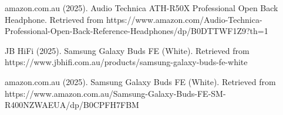 \documentclass[a4paper,12pt]{article}
\begin{document}
\begin{thebibliography}{99}
amazon.com.au (2025).
Audio Technica ATH-R50X Professional Open Back Headphone.
Retrieved from https://www.amazon.com/Audio-Technica-Professional-Open-Back-Reference-Headphones/dp/B0DTTWF1Z9?th=1

JB HiFi (2025).
Samsung Galaxy Buds FE (White).
Retrieved from https://www.jbhifi.com.au/products/samsung-galaxy-buds-fe-white

amazon.com.au (2025).
Samsung Galaxy Buds FE (White).
Retrieved from https://www.amazon.com.au/Samsung-Galaxy-Buds-FE-SM-R400NZWAEUA/dp/B0CPFH7FBM

\end{thebibliography}
\end{document}
